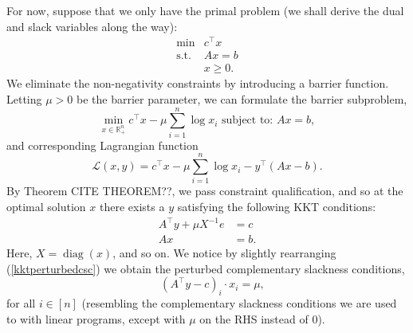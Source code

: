 \documentclass[11pt]{article}
\numberwithin{equation}{section}
\theoremstyle{definition}
\newcommand{\bR}{\mathbb{R}}
\newcommand{\cL}{\mathcal{L}}
\newcommand{\tst}{\text{s.t.}}
\newcommand{\diag}{\operatorname{diag}}
\begin{document}
For now, suppose that we only have the primal problem (we shall derive the dual and slack variables along the way):
\begin{equation}
    \begin{array}{cc}
         \min & c^\top x  \\
         \tst & Ax=b\\
              & x\ge 0.
    \end{array}
\end{equation}
We eliminate the non-negativity constraints by introducing a barrier function. Letting $\mu>0$ be the barrier parameter, we can formulate the barrier subproblem,
\begin{equation}
    \min_{x\in\bR^n_+} c^\top x-\mu\sum_{i=1}^n\log x_i \text{ subject to: } Ax=b,
\end{equation}
and corresponding Lagrangian function
\begin{equation}
    \cL(x,y)= c^\top x-\mu\sum_{i=1}^n\log x_i-y^\top(Ax-b).
\end{equation}
By Theorem CITE THEOREM??, we pass constraint qualification, and so at the optimal solution $x$ there exists a $y$ satisfying the following KKT conditions:
\begin{align}
    \label{kktperturbedcsc}
    A^\top y+\mu X^{-1}e&=c\\
    Ax&=b.
\end{align}
Here, $X=\diag(x)$, and so on. We notice by slightly rearranging (\ref{kktperturbedcsc}) we obtain the perturbed complementary slackness conditions,
\begin{equation}
    \quad (A^\top y-c)_i\cdot x_i=\mu,
\end{equation}
for all $i\in[n]$ (resembling the complementary slackness conditions we are used to with linear programs, except with $\mu$ on the RHS instead of $0$).
\end{document}
